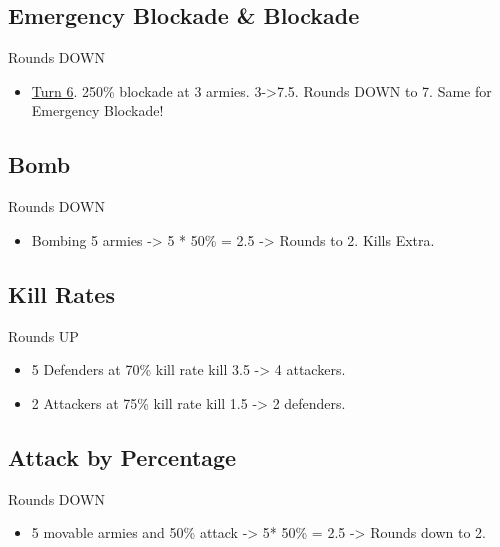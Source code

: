 \subsection{Emergency Blockade \& Blockade}

Rounds DOWN

\begin{itemize}
    \item \href{https://www.warzone.com/MultiPlayer?GameID=41361948}{Turn 6}. 250\% blockade at 3 armies. 3->7.5. Rounds DOWN to 7. Same for Emergency Blockade!
\end{itemize}

\subsection{Bomb}

Rounds DOWN

\begin{itemize}
    \item Bombing 5 armies -> 5 * 50\% = 2.5 -> Rounds to 2. Kills Extra.
\end{itemize}

\subsection{Kill Rates}

Rounds UP
\begin{itemize}
    \item 5 Defenders at 70\% kill rate kill 3.5 -> 4 attackers.
    \item 2 Attackers at 75\% kill rate kill 1.5 -> 2 defenders.
\end{itemize}

\subsection{Attack by Percentage}

Rounds DOWN

\begin{itemize}
    \item 5 movable armies and 50\% attack -> 5* 50\% = 2.5 -> Rounds down to 2.
\end{itemize}


